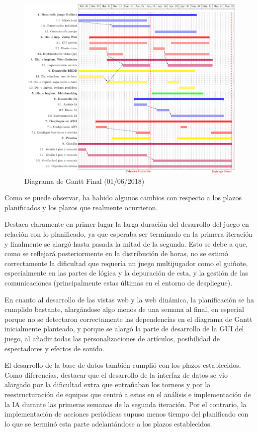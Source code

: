 \begin{figure}[H]
	\centering
	\includegraphics[scale=0.6]{figuras/gantt.pdf}
	\caption{Diagrama de Gantt Final (01/06/2018)}
\end{figure}

Como se puede observar, ha habido algunos cambios con respecto a los plazos planificados y los plazos que realmente ocurrieron. 

Destaca claramente en primer lugar la larga duración del desarrollo del juego en relación con lo planificado, ya que esperaba ser terminado en la primera iteración y finalmente se alargó hasta pasada la mitad de la segunda. Esto se debe a que, como se reflejará posteriormente en la distribución de horas, no se estimó correctamente la dificultad que requería un juego multijugador como el guiñote, especialmente en las partes de lógica y la depuración de esta, y la gestión de las comunicaciones (principalmente estas últimas en el entorno de despliegue).

En cuanto al desarrollo de las vistas web y la web dinámica, la planificación se ha cumplido bastante, alargándose algo menos de una semana al final, en especial porque no se detectaron correctamente las dependencias en el diagrama de Gantt inicialmente planteado, y porque se alargó la parte de desarrollo de la GUI del juego, al añadir todas las personalizaciones de artículos, posibilidad de espectadores y efectos de sonido.

El desarrollo de la base de datos también cumplió con los plazos establecidos. Como diferencias, destacar que el desarrollo de la interfaz de datos se vio alargado por la dificultad extra que entrañaban los torneos y por la reestructuración de equipos que centró a estos en el análisis e implementación de la IA durante las primeras semanas de la segunda iteración. Por el contrario, la implementación de acciones periódicas supuso menos tiempo del planificado con lo que se terminó esta parte adelantándose a los plazos establecidos.

